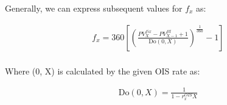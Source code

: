 \documentclass[12pt]{article}
\begin{document}
\noindent Generally, we can express subsequent values for $f_x$ as:

\begin{gather*}
f_x = 360\left[\left( \frac{PV_{X}^{fix}-PV_{X-1}^{flt}+1}{\text{Do}(0, X)}\right)^\frac{1}{360} -1\right]\\
\end{gather*}

\noindent Where {(0, X)} is calculated by the given OIS rate as:

\begin{gather*}
{\text{Do}(0, X)} = \frac{1}{1-r_x^{OIS}X}
\end{gather*}
\end{document}
